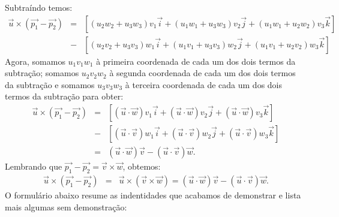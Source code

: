 Subtraíndo temos:
\begin{eqnarray*}
\vec{u}\times\left(\vec{p_1}-\vec{p_2}\right)&=&    \left[\left(u_2w_2+u_3w_3\right)v_1\vec{i}+\left(u_1w_1+u_3w_3\right)v_2\vec{j}+\left(u_1w_1+u_2w_2\right)v_3\vec{k}\right]\\
&-&
\left[\left(u_2v_2+u_3v_3\right)w_1\vec{i}+\left(u_1v_1+u_3v_3\right)w_2\vec{j}+\left(u_1v_1+u_2v_2\right)w_3\vec{k}\right]
\end{eqnarray*}
Agora, somamos $u_1v_1w_1$ à primeira coordenada de cada um dos dois termos da subtração; somamos $u_2v_2w_2$  à segunda coordenada de cada um dos dois termos da subtração e somamos $u_3v_3w_3$ à terceira coordenada de cada um dos dois termos da subtração para obter:
 \begin{eqnarray*}
 \vec{u}\times\left(\vec{p_1}-\vec{p_2}\right)&=&    \left[\left(\vec{u}\cdot\vec{w}\right)v_1\vec{i}+\left(\vec{u}\cdot\vec{w}\right)v_2\vec{j}+\left(\vec{u}\cdot\vec{w}\right)v_3\vec{k}\right]\\
 &-&
 \left[\left(\vec{u}\cdot\vec{v}\right)w_1\vec{i}+\left(\vec{u}\cdot\vec{v}\right)w_2\vec{j}+\left(\vec{u}\cdot\vec{v}\right)w_3\vec{k}\right]\\
 &=&(\vec{u}\cdot\vec{w})\vec{v}-(\vec{u}\cdot\vec{v})\vec{w}.
 \end{eqnarray*}
Lembrando que $\vec{p_1}-\vec{p_2}=\vec{v}\times\vec{w}$, obtemos:
\begin{eqnarray*}
\vec{u}\times\left(\vec{p_1}-\vec{p_2}\right)&=& 
\vec{u}\times\left(\vec{v}\times\vec{w}\right)=(\vec{u}\cdot\vec{w})\vec{v}-(\vec{u}\cdot\vec{v})\vec{w}.
\end{eqnarray*}
O formulário abaixo resume as indentidades que acabamos de demonstrar e lista mais algumas sem demonstração:


